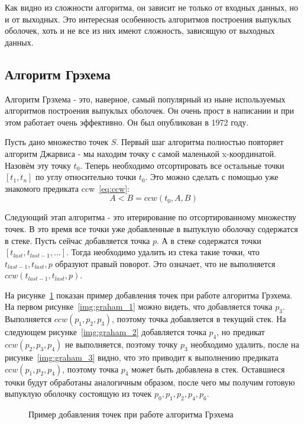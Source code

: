 Как видно из сложности алгоритма, он зависит не только от входных данных, но и от выходных. Это интересная особенность алгоритмов построения выпуклых оболочек, хоть и не все из них имеют сложность, зависящую от выходных данных.

\subsection{Алгоритм Грэхема} \label{subsect1_1_2}

Алгоритм Грэхема - это, наверное, самый популярный из ныне используемых алгоритмов построения выпуклых оболочек. Он очень прост в написании и при этом работает очень эффективно. Он был опубликован в 1972 году. %

Пусть дано множество точек $S$. Первый шаг алгоритма полностью повторяет алгоритм Джарвиса - мы находим точку с самой маленькой x-координатой. Назовём эту точку $t_0$. Теперь необходимо отсортировать все остальные точки $[t_1, t_n]$ по углу относительно точки $t_0$. Это можно сделать с помощью уже знакомого предиката ccw~\eqref{eq:ccw}:
\[
A<B=ccw(t_0, A, B)
\]

Следующий этап алгоритма - это итерирование по отсортированному множеству точек. В это время все точки уже добавленные в выпуклую оболочку содержатся в стеке. Пусть сейчас добавляется точка $p$. А в стеке содержатся точки $[t_{last}, t_{last-1}, ...]$. Тогда необходимо удалить из стека такие точки, что $t_{last-1}, t_{last}, p$ образуют правый поворот. Это означает, что не выполняется $ccw(t_{last-1}, t_{last}, p)$.

На рисунке~\ref{img:graham} показан пример добавления точек при работе алгоритма Грэхема. На первом рисунке~\ref{img:graham_1} можно видеть, что добавляется точка $p_3$. Выполняется $ccw(p_1, p_2, p_3)$, поэтому точка добавляется в текущий стек. На следующем рисунке~\ref{img:graham_2} добавляется точка $p_4$, но предикат $ccw(p_2, p_3, p_4)$ не выполняется, поэтому точку $p_3$ необходимо удалить, после на рисунке~\ref{img:graham_3} видно, что это приводит к выполнению предиката $ccw(p_1, p_2, p_4)$, поэтому точка $p_4$ может быть добавлена в стек. Оставшиеся точки будут обработаны аналогичным образом, после чего мы получим готовую выпуклую оболочку состоящую из точек $p_0, p_1, p_2, p_4, p_6$.

\begin{figure}[H]
	{\centering
		\hfill
		\subbottom[\label{img:graham_1}]{%
			}
		\hfill
		\subbottom[\label{img:graham_2}]{%
			}
		\hfill
		\subbottom[\label{img:graham_3}]{%
			}
		\hfill
	}
	\caption{Пример добавления точек при работе алгоритма Грэхема}
	\label{img:graham}
\end{figure}

